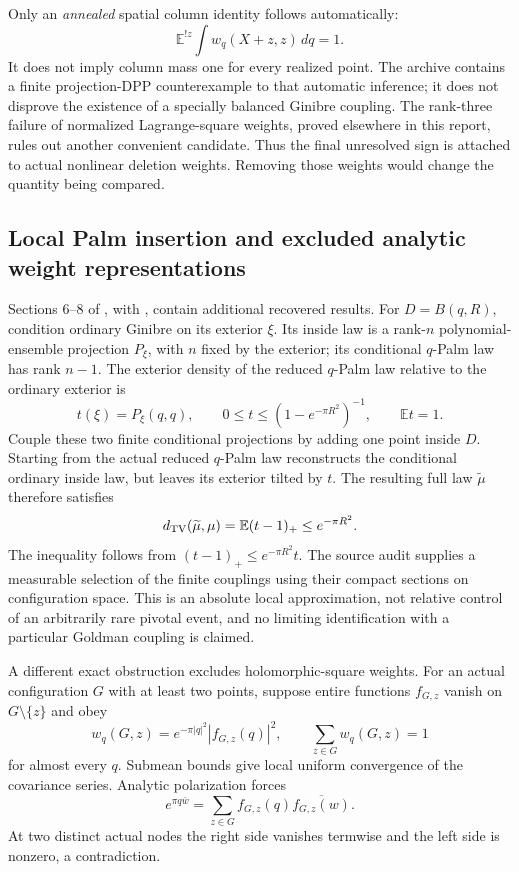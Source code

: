 \documentclass[11pt,a4paper]{article}
\theoremstyle{definition}
\theoremstyle{remark}
\numberwithin{equation}{section}
\begin{document}
Only an \emph{annealed} spatial column identity follows automatically:
\[
 \mathbb E^{!z}\int w_q(X+z,z)\,dq=1.
\]
It does not imply column mass one for every realized point.  The archive
contains a finite projection-DPP counterexample to that automatic
inference; it does not disprove the existence of a specially balanced
Ginibre coupling.  The rank-three failure of normalized Lagrange-square
weights, proved elsewhere in this report, rules out another convenient
candidate.  Thus the final unresolved sign is attached to actual
nonlinear deletion weights.  Removing those weights would change the
quantity being compared.

\subsection{Local Palm insertion and excluded analytic weight representations}
\label{br:palm-local}

Sections 6--8 of , with
, contain additional
recovered results. For $D=B(q,R)$, condition ordinary Ginibre on
its exterior $\xi$. Its inside law is a rank-$n$ polynomial-ensemble
projection $P_\xi$, with $n$ fixed by the exterior; its conditional
$q$-Palm law has rank $n-1$. The exterior density of the reduced
$q$-Palm law relative to the ordinary exterior is
\[
 t(\xi)=P_\xi(q,q),\qquad
 0\le t\le(1-e^{-\pi R^2})^{-1},\qquad \mathbb E t=1.
\]
Couple these two finite conditional projections by adding one point
inside $D$. Starting from the actual reduced $q$-Palm law reconstructs
the conditional ordinary inside law, but leaves its exterior tilted
by $t$. The resulting full law $\widetilde\mu$ therefore satisfies
\begin{equation}\label{br:local-insertion-tv}
 d_{\rm TV}(\widetilde\mu,\mu)
       =\mathbb E(t-1)_+\le e^{-\pi R^2}.
\end{equation}
The inequality follows from $(t-1)_+\le e^{-\pi R^2}t$.
The source audit supplies a measurable selection of the finite
couplings using their compact sections on configuration space.
This is an absolute local approximation, not relative control of
an arbitrarily rare pivotal event, and no limiting identification
with a particular Goldman coupling is claimed.

A different exact obstruction excludes holomorphic-square weights.
For an actual configuration $G$ with at least two points, suppose
entire functions $f_{G,z}$ vanish on $G\setminus\{z\}$ and obey
\[
 w_q(G,z)=e^{-\pi|q|^2}|f_{G,z}(q)|^2,\qquad
                   \sum_{z\in G}w_q(G,z)=1
\]
for almost every $q$. Submean bounds give local uniform convergence
of the covariance series. Analytic polarization forces
\[
 e^{\pi q\bar w}=\sum_{z\in G}
                     f_{G,z}(q)\overline{f_{G,z}(w)}.
\]
At two distinct actual nodes the right side vanishes termwise and
the left side is nonzero, a contradiction.
\end{document}
